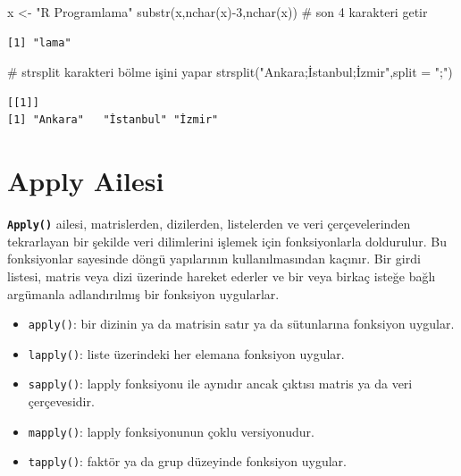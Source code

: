 \documentclass[
  letterpaper,
  DIV=11,
  numbers=noendperiod]{scrreprt}
\newenvironment{Shaded}{\begin{snugshade}}{\end{snugshade}}
\newcommand{\AttributeTok}[1]{\textcolor[rgb]{0.40,0.45,0.13}{#1}}
\newcommand{\CommentTok}[1]{\textcolor[rgb]{0.37,0.37,0.37}{#1}}
\newcommand{\DecValTok}[1]{\textcolor[rgb]{0.68,0.00,0.00}{#1}}
\newcommand{\FunctionTok}[1]{\textcolor[rgb]{0.28,0.35,0.67}{#1}}
\newcommand{\NormalTok}[1]{\textcolor[rgb]{0.00,0.23,0.31}{#1}}
\newcommand{\OtherTok}[1]{\textcolor[rgb]{0.00,0.23,0.31}{#1}}
\newcommand{\SpecialCharTok}[1]{\textcolor[rgb]{0.37,0.37,0.37}{#1}}
\newcommand{\StringTok}[1]{\textcolor[rgb]{0.13,0.47,0.30}{#1}}
\begin{document}
\begin{Shaded}
\begin{Highlighting}[]
\NormalTok{x }\OtherTok{\textless{}{-}} \StringTok{"R Programlama"}
\FunctionTok{substr}\NormalTok{(x,}\FunctionTok{nchar}\NormalTok{(x)}\SpecialCharTok{{-}}\DecValTok{3}\NormalTok{,}\FunctionTok{nchar}\NormalTok{(x)) }\CommentTok{\# son 4 karakteri getir}
\end{Highlighting}
\end{Shaded}

\begin{verbatim}
[1] "lama"
\end{verbatim}

\begin{Shaded}
\begin{Highlighting}[]
\CommentTok{\# strsplit karakteri bölme işini yapar}
\FunctionTok{strsplit}\NormalTok{(}\StringTok{"Ankara;İstanbul;İzmir"}\NormalTok{,}\AttributeTok{split =} \StringTok{";"}\NormalTok{)}
\end{Highlighting}
\end{Shaded}

\begin{verbatim}
[[1]]
[1] "Ankara"   "İstanbul" "İzmir"   
\end{verbatim}

\hypertarget{apply-ailesi}{%
\chapter{Apply Ailesi}\label{apply-ailesi}}

\textbf{\texttt{Apply()}} ailesi, matrislerden, dizilerden, listelerden
ve veri çerçevelerinden tekrarlayan bir şekilde veri dilimlerini işlemek
için fonksiyonlarla doldurulur. Bu fonksiyonlar sayesinde döngü
yapılarının kullanılmasından kaçınır. Bir girdi listesi, matris veya
dizi üzerinde hareket ederler ve bir veya birkaç isteğe bağlı argümanla
adlandırılmış bir fonksiyon uygularlar.

\begin{itemize}
\item
  \texttt{apply()}: bir dizinin ya da matrisin satır ya da sütunlarına
  fonksiyon uygular.
\item
  \texttt{lapply()}: liste üzerindeki her elemana fonksiyon uygular.
\item
  \texttt{sapply()}: lapply fonksiyonu ile aynıdır ancak çıktısı matris
  ya da veri çerçevesidir.
\item
  \texttt{mapply()}: lapply fonksiyonunun çoklu versiyonudur.
\item
  \texttt{tapply()}: faktör ya da grup düzeyinde fonksiyon uygular.
\end{itemize}
\end{document}
